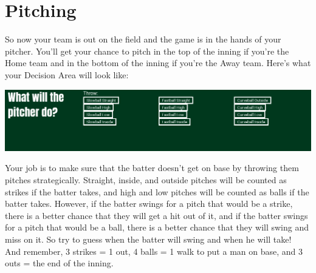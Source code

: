 \documentclass[12pt,a4paper]{report}
\begin{document}
\section{Pitching}
So now your team is out on the field and the game is in the hands of your pitcher. You'll get your chance to pitch in the top of the inning if you're the Home team and in the bottom of the inning if you're the Away team. Here's what your Decision Area will look like:
\begin{center}
	\includegraphics[width=1\linewidth]{umInclude/message}
\end{center}
Your job is to make sure that the batter doesn't get on base by throwing them pitches strategically. Straight, inside, and outside pitches will be counted as strikes if the batter takes, and high and low pitches will be counted as balls if the batter takes. However, if the batter swings for a pitch that would be a strike, there is a better chance that they will get a hit out of it, and if the batter swings for a pitch that would be a ball, there is a better chance that they will swing and miss on it. So try to guess when the batter will swing and when he will take!\\
And remember, 3 strikes = 1 out, 4 balls = 1 walk to put a man on base, and 3 outs = the end of the inning.
\end{document}

